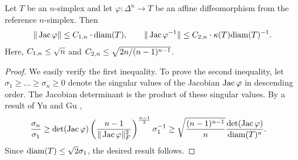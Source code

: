 \documentclass[12pt,a4paper]{article}
\begin{document}
\begin{lemma}\label{lemma:affinetransform}
    Let $T$ be an $n$-simplex and let $\varphi : \Delta^{n} \rightarrow T$ be an affine diffeomorphism from the reference $n$-simplex. Then 
    \begin{align*}
        \| \Jacobian \varphi \|
        \leq 
        \Ceins{n} \cdot \diam(T) %
        ,
        \qquad 
        \| \Jacobian \varphi^{-1} \|
        \leq 
        \Czwei{n} \cdot 
        \kappa(T) 
        \diam(T)^{-1}
        .
    \end{align*}
    Here, $C_{1,n} \leq \sqrt{n}$ and $C_{2,n} \leq \sqrt{ 2n/(n-1)^{n-1} }$. 
\end{lemma}
\begin{proof}
    We easily verify the first inequality. To prove the second inequality, let $\sigma_1 \geq \dots \geq \sigma_n \geq 0$ denote the singular values of the Jacobian $\operatorname{{\rm Jac}}\varphi$ in descending order.
    The Jacobian determinant is the product of these singular values. 
    By a result of Yu and Gu \cite{yisheng1997note},
    \begin{align*}
        \frac{ \sigma_{n} }{ \sigma_{1} }
        &\geq 
        \det(\operatorname{{\rm Jac}}\varphi)
        \left( \frac{n-1}{\|\operatorname{{\rm Jac}}\varphi\|_{F}^{2}} \right)^{\frac{n-1}{2}}
        \sigma_{1}^{-1}
        \geq 
        \sqrt{\frac{ (n-1)^{n-1} }{n} }
        \frac{ \det(\operatorname{{\rm Jac}}\varphi) }{ {\operatorname{diam}}(T)^{n} }
        .
    \end{align*}
    Since ${\operatorname{diam}}(T) \leq \sqrt{2} \sigma_{1}$, the desired result follows. 
\end{proof}
\end{document}
